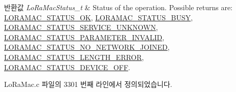 \begin{DoxyRetVals}{반환값}
{\em Lo\+Ra\+Mac\+Status\+\_\+t} & Status of the operation. Possible returns are\+: \mbox{\hyperlink{group___l_o_r_a_m_a_c_gga1d18f26b344040b3ec5c3db662919661a03db5fca052313edb3823c014b653a74}{L\+O\+R\+A\+M\+A\+C\+\_\+\+S\+T\+A\+T\+U\+S\+\_\+\+OK}}, \mbox{\hyperlink{group___l_o_r_a_m_a_c_gga1d18f26b344040b3ec5c3db662919661a66b12f569207eacd97ee1c1d6c4cee6d}{L\+O\+R\+A\+M\+A\+C\+\_\+\+S\+T\+A\+T\+U\+S\+\_\+\+B\+U\+SY}}, \mbox{\hyperlink{group___l_o_r_a_m_a_c_gga1d18f26b344040b3ec5c3db662919661aff502a87db22d6a9a4919e4b54c7c1cf}{L\+O\+R\+A\+M\+A\+C\+\_\+\+S\+T\+A\+T\+U\+S\+\_\+\+S\+E\+R\+V\+I\+C\+E\+\_\+\+U\+N\+K\+N\+O\+WN}}, \mbox{\hyperlink{group___l_o_r_a_m_a_c_gga1d18f26b344040b3ec5c3db662919661ad0d3119f247d00e1787dda106fcb3017}{L\+O\+R\+A\+M\+A\+C\+\_\+\+S\+T\+A\+T\+U\+S\+\_\+\+P\+A\+R\+A\+M\+E\+T\+E\+R\+\_\+\+I\+N\+V\+A\+L\+ID}}, \mbox{\hyperlink{group___l_o_r_a_m_a_c_gga1d18f26b344040b3ec5c3db662919661a105228330376111d46d99d57688a20ae}{L\+O\+R\+A\+M\+A\+C\+\_\+\+S\+T\+A\+T\+U\+S\+\_\+\+N\+O\+\_\+\+N\+E\+T\+W\+O\+R\+K\+\_\+\+J\+O\+I\+N\+ED}}, \mbox{\hyperlink{group___l_o_r_a_m_a_c_gga1d18f26b344040b3ec5c3db662919661a4ab40311dcd2eeffc77f573a919b29b1}{L\+O\+R\+A\+M\+A\+C\+\_\+\+S\+T\+A\+T\+U\+S\+\_\+\+L\+E\+N\+G\+T\+H\+\_\+\+E\+R\+R\+OR}}, \mbox{\hyperlink{group___l_o_r_a_m_a_c_gga1d18f26b344040b3ec5c3db662919661aff1d3a91250809d1770a74776057b8ce}{L\+O\+R\+A\+M\+A\+C\+\_\+\+S\+T\+A\+T\+U\+S\+\_\+\+D\+E\+V\+I\+C\+E\+\_\+\+O\+FF}}. \\
\hline
\end{DoxyRetVals}


Lo\+Ra\+Mac.\+c 파일의 3301 번째 라인에서 정의되었습니다.


